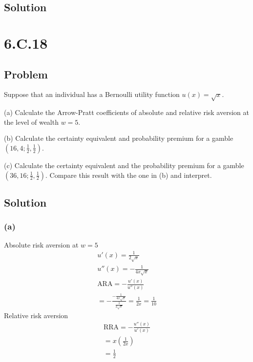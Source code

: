 \documentclass[10pt, a4paper]{article}
\begin{document}
    \subsection*{Solution}

  \section*{6.C.18}
    \subsection*{Problem}
      Suppose that an individual has a Bernoulli utility function $u(x) = \sqrt{x}$.

      (a) Calculate the Arrow-Pratt coefficients of absolute and relative risk aversion at the level of wealth $w=5$.

      (b) Calculate the certainty equivalent and probability premium for a gamble $(16,4;\frac{1}{2},\frac{1}{2})$.

      (c) Calculate the certainty equivalent and the probability premium for a gamble $(36, 16; \frac{1}{2}, \frac{1}{2})$. Compare this result with the one in (b) and interpret.
    \subsection*{Solution}
      \subsubsection*{(a)}
        Absolute risk aversion at $w=5$
          \begin{gather*}
            u'(x) = \frac{1}{2\sqrt{x}}\\
            u''(x) = -\frac{1}{4x\sqrt{x}}\\
            \text{ARA} = -\frac{u'(x)}{u''(x)} \\
            = -\frac{-\frac{1}{4x\sqrt{x}}}{\frac{1}{2\sqrt{x}}}
            = \frac{1}{2x}
            = \frac{1}{10}
          \end{gather*}
        Relative risk aversion
          \begin{gather*}
            \text{RRA} = -\frac{u''(x)}{u'(x)}\\
            = x(\frac{1}{2x})\\
            =\frac{1}{2}
          \end{gather*}
\end{document}
